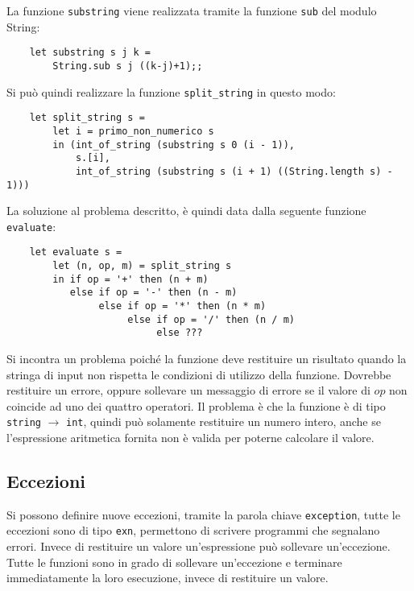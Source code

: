 \documentclass{article}
\numberwithin{equation}{subsection}
\begin{document}
La funzione \verb|substring| viene realizzata tramite la funzione \verb|sub| del modulo String:
\begin{verbatim}
    let substring s j k =
        String.sub s j ((k-j)+1);;    
\end{verbatim}

Si può quindi realizzare la funzione \verb|split_string| in questo modo:
\begin{verbatim}
    let split_string s =
        let i = primo_non_numerico s 
        in (int_of_string (substring s 0 (i - 1)),
            s.[i],
            int_of_string (substring s (i + 1) ((String.length s) - 1)))
\end{verbatim}

La soluzione al problema descritto, è quindi data dalla seguente funzione \verb|evaluate|:
\begin{verbatim}
    let evaluate s =
        let (n, op, m) = split_string s
        in if op = '+' then (n + m)
           else if op = '-' then (n - m)
                else if op = '*' then (n * m)
                     else if op = '/' then (n / m)
                          else ???    
\end{verbatim}
Si incontra un problema poiché la funzione deve restituire un risultato quando la stringa di input non rispetta le condizioni di utilizzo della funzione. Dovrebbe restituire un errore, oppure sollevare un messaggio di errore se il valore di $op$ non coincide ad uno dei quattro operatori. Il problema è che la funzione è di tipo \verb|string| $\rightarrow$ \verb|int|, quindi può solamente restituire un numero intero, anche se l'espressione aritmetica fornita non è valida per poterne calcolare il valore. 

\subsection{Eccezioni}

Si possono definire nuove eccezioni, tramite la parola chiave \verb|exception|, tutte le eccezioni sono di tipo \verb|exn|, permettono di scrivere programmi che segnalano errori. Invece di restituire un valore un'espressione può sollevare un'eccezione. Tutte le funzioni sono in grado di sollevare un'eccezione e terminare immediatamente la loro esecuzione, invece di restituire un valore. 
\end{document}
